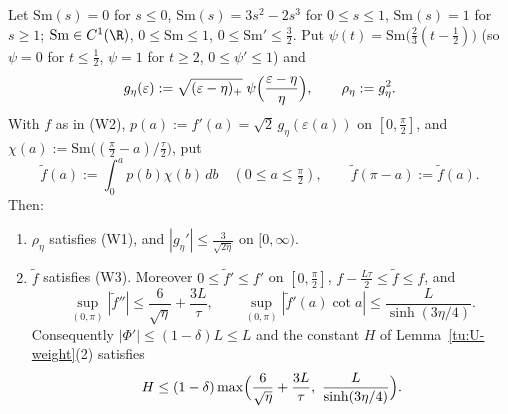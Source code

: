 \begin{lemma}\label{tu:U-W13}
Let $\mathrm{Sm}(s)=0$ for $s\le0$, $\mathrm{Sm}(s)=3s^2-2s^3$ for $0\le s\le1$, $\mathrm{Sm}(s)=1$ for $s\ge1$; $\mathrm{Sm}\in C^1(\R)$,
$0\le\mathrm{Sm}\le1$, $0\le\mathrm{Sm}'\le\frac32$. Put $\psi(t)=\mathrm{Sm}\bigl(\frac23(t-\frac12)\bigr)$ (so $\psi=0$ for $t\le\frac12$,
$\psi=1$ for $t\ge2$, $0\le\psi'\le1$) and
\[
g_\eta(\varepsilon):=\sqrt{(\varepsilon-\eta)_+}\;\psi\Bigl(\frac{\varepsilon-\eta}{\eta}\Bigr),\qquad \rho_\eta:=g_\eta^2 .
\]
With $f$ as in (W2), $p(a):=f'(a)=\sqrt2\,g_\eta(\varepsilon(a))$ on $[0,\frac\pi2]$, and $\chi(a):=\mathrm{Sm}\bigl((\frac\pi2-a)/\frac\tau2\bigr)$, put
\[
\tilde f(a):=\int_0^a p(b)\chi(b)\,db\quad(0\le a\le\tfrac\pi2),\qquad \tilde f(\pi-a):=\tilde f(a).
\]
Then:
\begin{enumerate}
\item $\rho_\eta$ satisfies (W1), and $|g_\eta'|\le\frac{3}{\sqrt{2\eta}}$ on $[0,\infty)$.
\item $\tilde f$ satisfies (W3). Moreover $0\le\tilde f'\le f'$ on $[0,\frac\pi2]$, $f-\frac{L\tau}2\le\tilde f\le f$, and
\[
\sup_{(0,\pi)}|\tilde f''|\le\frac{6}{\sqrt\eta}+\frac{3L}{\tau},\qquad
\sup_{(0,\pi)}|\tilde f'(a)\cot a|\le\frac{L}{\sinh(3\eta/4)} .
\]
Consequently $|\Phi'|\le(1-\delta)L\le L$ and the constant $H$ of Lemma~\ref{tu:U-weight}(2) satisfies
\[
H\le(1-\delta)\max\Bigl(\frac6{\sqrt\eta}+\frac{3L}\tau,\ \frac{L}{\sinh(3\eta/4)}\Bigr).
\]
\end{enumerate}
\end{lemma}

